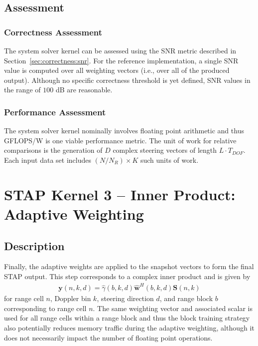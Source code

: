 \documentclass{report}
\begin{document}
\subsection{Assessment}

\subsubsection{Correctness Assessment}

The system solver kernel can be assessed using the SNR metric described
in Section~\ref{sec:correctness:snr}.
For the reference implementation, a single SNR value is computed over all
weighting vectors (i.e., over all of the produced output).
Although no specific correctness threshold is yet defined, SNR values in the
range of $100$ dB are reasonable.

\subsubsection{Performance Assessment}

The system solver kernel nominally involves floating point arithmetic and
thus GFLOPS/W is one viable performance metric.
The unit of work for relative comparisons is the generation of $D$ complex
steering vectors of length $L \cdot T_{DOF}$.
Each input data set includes $(N/N_R) \times K$ such units of work.


\section{STAP Kernel 3 -- Inner Product: \\ Adaptive Weighting}
\label{sec:stap:adaptive_weighting}

\subsection{Description}

Finally, the adaptive weights are applied to the snapshot vectors
to form the final STAP output.
This step corresponds to a complex inner product and is given by
\begin{align}
    \mathbf{y}(n,k,d) = \hat{\gamma}(b,k,d) \hat{\mathbf{w}}^H(b,k,d) \mathbf{S}(n,k)
    \label{eq:stap:gamma}
\end{align}
for range cell $n$, Doppler bin $k$, steering direction $d$, and
range block $b$ corresponding to range cell $n$.
The same weighting vector and associated scalar is used for all
range cells within a range block and thus the block training
strategy also potentially reduces memory traffic during the adaptive
weighting, although it does not necessarily impact the
number of floating point operations.
\end{document}
